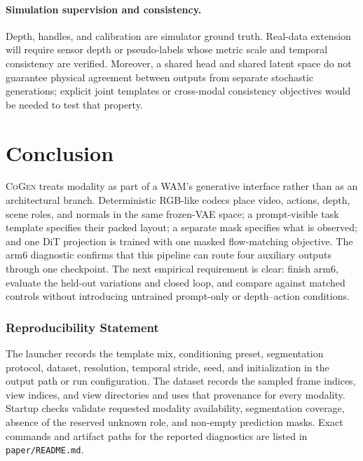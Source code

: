 \documentclass{article}
\newcommand{\method}{\textsc{CoGen}}
\newcommand{\code}[1]{\texttt{#1}}
\begin{document}
\paragraph{Simulation supervision and consistency.}
Depth, handles, and calibration are simulator ground truth. Real-data extension will require
sensor depth or pseudo-labels whose metric scale and temporal consistency are verified. Moreover,
a shared head and shared latent space do not guarantee physical agreement between outputs from
separate stochastic generations; explicit joint templates or cross-modal consistency objectives
would be needed to test that property.

\section{Conclusion}

\method{} treats modality as part of a WAM's generative interface rather than as an architectural
branch. Deterministic RGB-like codecs place video, actions, depth, scene roles, and normals in the
same frozen-VAE space; a prompt-visible task template specifies their packed layout; a separate
mask specifies what is observed; and one DiT projection is trained with one masked flow-matching
objective. The arm6 diagnostic confirms that this pipeline can route four auxiliary outputs
through one checkpoint. The next empirical requirement is clear: finish arm6, evaluate the
held-out variations and closed loop, and compare against matched controls without introducing
untrained prompt-only or depth--action conditions.

\subsubsection*{Reproducibility Statement}
The launcher records the template mix, conditioning preset, segmentation protocol, dataset,
resolution, temporal stride, seed, and initialization in the output path or run configuration.
The dataset records the sampled frame indices, view indices, and view directories and uses that
provenance for every modality. Startup checks validate requested modality availability,
segmentation coverage, absence of the reserved unknown role, and non-empty prediction masks.
Exact commands and artifact paths for the reported diagnostics are listed in
\code{paper/README.md}.




\appendix
\end{document}
